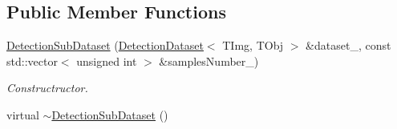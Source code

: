 \subsection*{Public Member Functions}
\begin{DoxyCompactItemize}
\item 
\hypertarget{class_vision_core_1_1_evaluation_1_1_detection_sub_dataset_a4acd269a8a0ec8b613b30500751444df}{}\hyperlink{class_vision_core_1_1_evaluation_1_1_detection_sub_dataset_a4acd269a8a0ec8b613b30500751444df}{Detection\+Sub\+Dataset} (\hyperlink{class_vision_core_1_1_evaluation_1_1_detection_dataset}{Detection\+Dataset}$<$ T\+Img, T\+Obj $>$ \&dataset\+\_\+, const std\+::vector$<$ unsigned int $>$ \&samples\+Number\+\_\+)\label{class_vision_core_1_1_evaluation_1_1_detection_sub_dataset_a4acd269a8a0ec8b613b30500751444df}

\begin{DoxyCompactList}\small\item\em Constructructor. \end{DoxyCompactList}\item 
\hypertarget{class_vision_core_1_1_evaluation_1_1_detection_sub_dataset_a969a20140a15bb8c98e8fa915963a6ce}{}virtual \hyperlink{class_vision_core_1_1_evaluation_1_1_detection_sub_dataset_a969a20140a15bb8c98e8fa915963a6ce}{$\sim$\+Detection\+Sub\+Dataset} ()\label{class_vision_core_1_1_evaluation_1_1_detection_sub_dataset_a969a20140a15bb8c98e8fa915963a6ce}


\end{DoxyCompactItemize}
